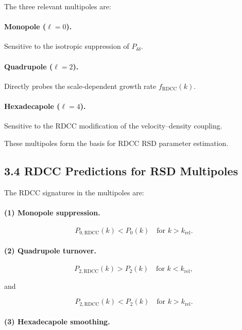 \documentclass[11pt,a4paper]{article}
\begin{document}
The three relevant multipoles are:

\paragraph{Monopole ($\ell=0$).}
Sensitive to the isotropic suppression of $P_{\delta\delta}$.

\paragraph{Quadrupole ($\ell=2$).}
Directly probes the scale-dependent growth rate $f_{\mathrm{RDCC}}(k)$.

\paragraph{Hexadecapole ($\ell=4$).}
Sensitive to the RDCC modification of the velocity–density coupling.

These multipoles form the basis for RDCC RSD parameter estimation.

\subsection{3.4 RDCC Predictions for RSD Multipoles}

The RDCC signatures in the multipoles are:

\paragraph{(1) Monopole suppression.}


\[
P_{0,\mathrm{RDCC}}(k) < P_{0}(k)
\quad \text{for } k > k_{\mathrm{rel}}.
\]



\paragraph{(2) Quadrupole turnover.}


\[
P_{2,\mathrm{RDCC}}(k)
>
P_{2}(k)
\quad \text{for } k < k_{\mathrm{rel}},
\]


and


\[
P_{2,\mathrm{RDCC}}(k)
<
P_{2}(k)
\quad \text{for } k > k_{\mathrm{rel}}.
\]



\paragraph{(3) Hexadecapole smoothing.}
\end{document}
